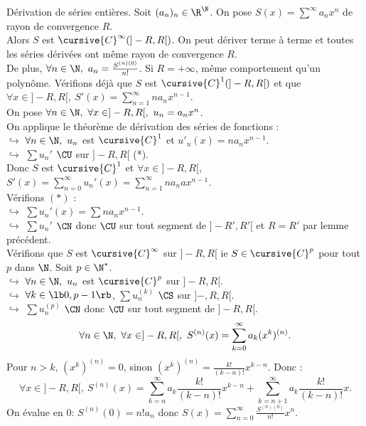 \documentclass[11pt]{article}
\begin{document}
\begin{thm}{Dérivation de séries entières.}{}
    Soit $(a_n)_n\in\R^\N$. On pose $S(x)=\sum^{\infty}a_nx^n$ de rayon de convergence $R$.\\
    Alors $S$ est $\cursive{C}^\infty(]-R,R[)$. On peut dériver terme à terme et toutes les séries dérivées ont même rayon de convergence $R$.\\
    De plus, $\forall n \in \N, ~ a_n = \frac{S^{(n)(0)}}{n!}$. Si $R=+\infty$, même comportement qu'un polynôme.
    \tcblower
    Vérifions déjà que $S$ est $\cursive{C}^1(]-R,R[)$ et que $\forall x \in ]-R,R[, ~ S'(x)=\sum_{n=1}^\infty na_nx^{n-1}$.\\
    On pose $\forall n \in \N, ~ \forall x \in ]-R,R[, ~ u_n=a_nx^n$.\\
    On applique le théorème de dérivation des séries de fonctions :\\
    $\hookrightarrow$ $\forall n \in \N, ~ u_n$ est $\cursive{C}^1$ et $u'_n(x)=na_nx^{n-1}$.\\
    $\hookrightarrow$ $\sum u_n'$ $\CU$ sur $]-R,R[$ (*).\\
    Donc $S$ est $\cursive{C}^1$ et $\forall x \in ]-R,R[$, ~ $S'(x)=\sum_{n=0}^\infty u_n'(x)=\sum_{n=1}^\infty na_nax^{n-1}$.\\
    Vérifions $(*)$ :\\
    $\hookrightarrow$ $\sum u_n'(x) = \sum na_nx^{n-1}$.\\
    $\hookrightarrow$ $\sum u_n'$ $\CN$ donc $\CU$ sur tout segment de $]-R',R'[$ et $R=R'$ par lemme précédent.\\
    Vérifions que $S$ est $\cursive{C}^\infty$ sur $]-R,R[$ ie $S\in\cursive{C}^p$ pour tout $p$ dans $\N$. Soit $p\in\N^*$.\\
    $\hookrightarrow$ $\forall n \in \N, ~ u_n$ est $\cursive{C}^p$ sur $]-R,R[$.\\
    $\hookrightarrow$ $\forall k \in \lb0,p-1\rb$, $\sum u_n^{(k)}$ $\CS$ sur $]-,R,R[$.\\
    $\hookrightarrow$ $\sum u_n^{(p)}$ $\CN$ donc $\CU$ sur tout segment de $]-R,R[$.
    \begin{equation*}
        \forall n \in \N, ~ \forall x \in ]-R,R[,  ~ S^{(n)}(x)=\sum_{k=0}^\infty a_k(x^k)^{(n)}.
    \end{equation*}
    Pour $n>k$, $(x^k)^{(n)}=0$, sinon $(x^k)^{(n)}=\frac{k!}{(k-n)!}x^{k-n}$. Donc :
    \begin{equation*}
        \forall x \in ]-R,R[, ~ S^{(n)}(x)=\sum_{k=n}^\infty a_k\frac{k!}{(k-n)!}x^{k-n} + \sum_{k=n+1}^\infty a_k\frac{k!}{(k-n)!}x.
    \end{equation*}
    On évalue en 0: $S^{(n)}(0)=n!a_n$ donc $S(x)=\sum_{n=0}^\infty\frac{S^{(n)(0)}}{n!}x^n$.
\end{thm}
\end{document}
